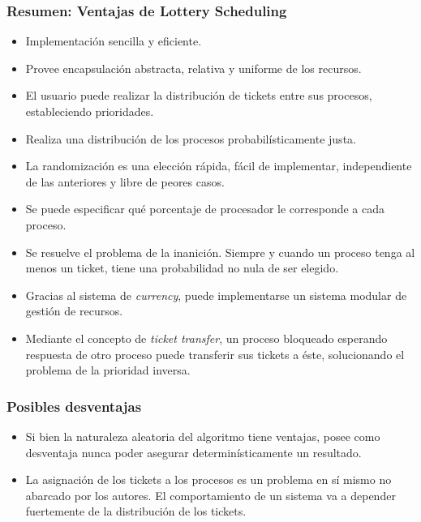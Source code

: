 \subsubsection{Resumen: Ventajas de Lottery Scheduling}

\begin{itemize}

\item Implementaci\'on sencilla y eficiente.

\item Provee encapsulaci\'on abstracta, relativa y uniforme de los recursos.

\item El usuario puede realizar la distribuci\'on de tickets entre sus procesos, estableciendo prioridades.

\item Realiza una distribuci\'on de los procesos probabil\'isticamente justa. 

\item La randomizaci\'on es una elecci\'on r\'apida, f\'acil de implementar, independiente de las anteriores y libre de peores casos.

\item Se puede especificar qu\'e porcentaje de procesador le corresponde a cada proceso.

\item Se resuelve el problema de la inanici\'on. Siempre y cuando un proceso tenga al menos un ticket, tiene una probabilidad no nula de ser elegido.

\item Gracias al sistema de \textit{currency}, puede implementarse un sistema modular de gesti\'on de recursos.

\item Mediante el concepto de \textit{ticket transfer}, un proceso bloqueado esperando respuesta de otro proceso puede transferir sus tickets a \'este, solucionando el problema de la prioridad inversa.


 \end{itemize}

\subsubsection{Posibles desventajas}

\begin{itemize}

\item Si bien la naturaleza aleatoria del algoritmo tiene ventajas, posee como desventaja nunca poder asegurar determin\'isticamente un resultado.

\item La asignaci\'on de los tickets a los procesos es un problema en s\'i mismo no abarcado por los autores. El comportamiento de un sistema va a depender fuertemente de la distribuci\'on de los tickets.

\end{itemize}

